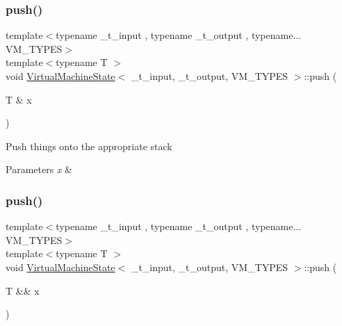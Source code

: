 \subsubsection{\texorpdfstring{push()}{push()}\hspace{0.1cm}{\footnotesize\ttfamily [1/2]}}
{\footnotesize\ttfamily template$<$typename \+\_\+t\+\_\+input , typename \+\_\+t\+\_\+output , typename... V\+M\+\_\+\+T\+Y\+P\+ES$>$ \\
template$<$typename T $>$ \\
void \hyperlink{class_virtual_machine_state}{Virtual\+Machine\+State}$<$ \+\_\+t\+\_\+input, \+\_\+t\+\_\+output, V\+M\+\_\+\+T\+Y\+P\+ES $>$\+::push (\begin{DoxyParamCaption}\item[{T \&}]{x }\end{DoxyParamCaption})\hspace{0.3cm}{\ttfamily [inline]}}

Push things onto the appropriate stack 
\begin{DoxyParams}{Parameters}
{\em x} & \\
\hline
\end{DoxyParams}
\mbox{\label{class_virtual_machine_state_a1f7aab5a5bb3b9cc4d79b50f6191ed36}} 
\subsubsection{\texorpdfstring{push()}{push()}\hspace{0.1cm}{\footnotesize\ttfamily [2/2]}}
{\footnotesize\ttfamily template$<$typename \+\_\+t\+\_\+input , typename \+\_\+t\+\_\+output , typename... V\+M\+\_\+\+T\+Y\+P\+ES$>$ \\
template$<$typename T $>$ \\
void \hyperlink{class_virtual_machine_state}{Virtual\+Machine\+State}$<$ \+\_\+t\+\_\+input, \+\_\+t\+\_\+output, V\+M\+\_\+\+T\+Y\+P\+ES $>$\+::push (\begin{DoxyParamCaption}\item[{T \&\&}]{x }\end{DoxyParamCaption})\hspace{0.3cm}{\ttfamily [inline]}}

\mbox{\label{class_virtual_machine_state_ae76dbfbf78879b1b0421720e635467a0}} 
